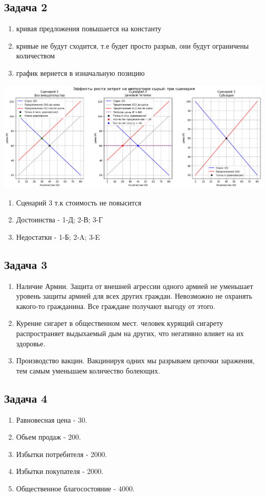 \documentclass[a4paper,12pt]{article}
\begin{document}
\subsection{Задача 2}
\begin{enumerate}
    \item кривая предложения повышается на константу 
    \item кривые не будут сходится, т.е будет просто разрыв, они будут ограничены количеством
    \item график вернется в изначальную позицию
\end{enumerate}
\includegraphics[scale=0.4]{graphs/3.1.png}
\begin{enumerate}
    \item Сценарий 3 т.к стоимость не повысится
    \item Достоинства - 1-Д; 2-В; 3-Г
    \item Недостатки - 1-Б; 2-A; 3-E
\end{enumerate}

\subsection{Задача 3}
\begin{enumerate}
    \item Наличие Армии. Защита от внешней агрессии одного армией не уменьшает уровень защиты армией для всех других граждан. Невозможно не охранять какого-то гражданина. Все граждане получают выгоду от этого.
    \item Курение сигарет в общественном мест. человек курящий сигарету распространяет выдыхаемый дым на других, что негативно влияет на их здоровье.
    \item Производство вакцин. Вакцинируя одних мы разрываем цепочки заражения, тем самым уменьшаем количество болеющих.
\end{enumerate}

\subsection{Задача 4}
\begin{enumerate}
    \item Равновесная цена - 30. 
    \item Обьем продаж - 200.
    \item Избытки потребителя - 2000. 
    \item Избытки покупателя - 2000. 
    \item Общественное благосостояние - 4000. 
\end{enumerate}
\end{document}
